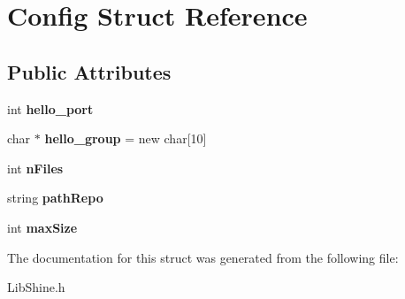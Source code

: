 \hypertarget{structConfig}{\section{Config Struct Reference}
\label{structConfig}
}
\subsection*{Public Attributes}
\begin{DoxyCompactItemize}
\item 
\hypertarget{structConfig_afc8ae6cab0cd9fa1ea54ca13bacd56ea}{int {\bfseries hello\-\_\-port}}\label{structConfig_afc8ae6cab0cd9fa1ea54ca13bacd56ea}

\item 
\hypertarget{structConfig_a2b1264000682b7de201becb6e6fb919d}{char $\ast$ {\bfseries hello\-\_\-group} = new char\mbox{[}10\mbox{]}}\label{structConfig_a2b1264000682b7de201becb6e6fb919d}

\item 
\hypertarget{structConfig_a4a5c2783f6aa2283fb3343082bff5ef7}{int {\bfseries n\-Files}}\label{structConfig_a4a5c2783f6aa2283fb3343082bff5ef7}

\item 
\hypertarget{structConfig_a0a3293605217709540e386fb81eca8bb}{string {\bfseries path\-Repo}}\label{structConfig_a0a3293605217709540e386fb81eca8bb}

\item 
\hypertarget{structConfig_acde368864b2d950bfde458664732a3c6}{int {\bfseries max\-Size}}\label{structConfig_acde368864b2d950bfde458664732a3c6}

\end{DoxyCompactItemize}


The documentation for this struct was generated from the following file\-:\begin{DoxyCompactItemize}
\item 
Lib\-Shine.\-h\end{DoxyCompactItemize}
